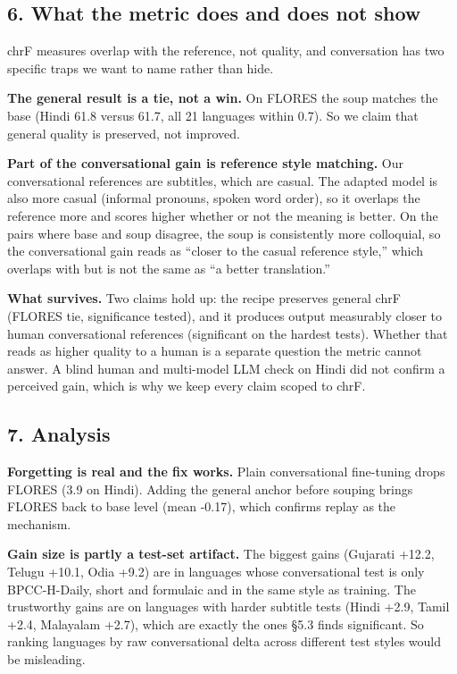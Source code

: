 \documentclass[
  11pt,
]{article}
\begin{document}
\hypertarget{what-the-metric-does-and-does-not-show}{%
\subsection{6. What the metric does and does not
show}\label{what-the-metric-does-and-does-not-show}}

chrF measures overlap with the reference, not quality, and conversation
has two specific traps we want to name rather than hide.

\textbf{The general result is a tie, not a win.} On FLORES the soup
matches the base (Hindi 61.8 versus 61.7, all 21 languages within 0.7).
So we claim that general quality is preserved, not improved.

\textbf{Part of the conversational gain is reference style matching.}
Our conversational references are subtitles, which are casual. The
adapted model is also more casual (informal pronouns, spoken word
order), so it overlaps the reference more and scores higher whether or
not the meaning is better. On the pairs where base and soup disagree,
the soup is consistently more colloquial, so the conversational gain
reads as ``closer to the casual reference style,'' which overlaps with
but is not the same as ``a better translation.''

\textbf{What survives.} Two claims hold up: the recipe preserves general
chrF (FLORES tie, significance tested), and it produces output
measurably closer to human conversational references (significant on the
hardest tests). Whether that reads as higher quality to a human is a
separate question the metric cannot answer. A blind human and
multi-model LLM check on Hindi did not confirm a perceived gain, which
is why we keep every claim scoped to chrF.

\hypertarget{analysis}{%
\subsection{7. Analysis}\label{analysis}}

\textbf{Forgetting is real and the fix works.} Plain conversational
fine-tuning drops FLORES (3.9 on Hindi). Adding the general anchor
before souping brings FLORES back to base level (mean -0.17), which
confirms replay as the mechanism.

\textbf{Gain size is partly a test-set artifact.} The biggest gains
(Gujarati +12.2, Telugu +10.1, Odia +9.2) are in languages whose
conversational test is only BPCC-H-Daily, short and formulaic and in the
same style as training. The trustworthy gains are on languages with
harder subtitle tests (Hindi +2.9, Tamil +2.4, Malayalam +2.7), which
are exactly the ones §5.3 finds significant. So ranking languages by raw
conversational delta across different test styles would be misleading.
\end{document}
